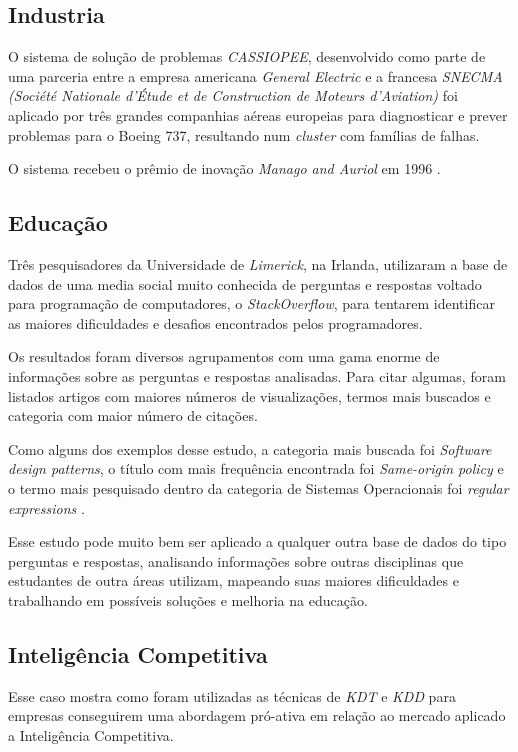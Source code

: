 \documentclass[conference]{IEEEtran}
\begin{document}
\subsection{Industria}
O sistema de solução de problemas \textit{CASSIOPEE}, desenvolvido como parte de uma parceria entre a empresa americana \textit{General Electric} e a francesa \textit{SNECMA (Société Nationale d'Étude et de Construction de Moteurs d'Aviation)} foi aplicado por três grandes companhias aéreas europeias para diagnosticar e prever problemas para o Boeing 737, resultando num \textit{cluster} com famílias de falhas.

O sistema recebeu o prêmio de inovação \textit{Manago and Auriol} em 1996 \cite{art9}.

\subsection{Educação}
Três pesquisadores da Universidade de \textit{Limerick}, na Irlanda, utilizaram a base de dados de uma media social muito conhecida de perguntas e respostas voltado para programação de computadores, o \textit{StackOverflow}, para tentarem identificar as maiores dificuldades e desafios encontrados pelos programadores. 

Os resultados foram diversos agrupamentos com uma gama enorme de informações sobre as perguntas e respostas analisadas. Para citar algumas, foram listados artigos com maiores números de visualizações, termos mais buscados e categoria com maior número de citações.

Como alguns dos exemplos desse estudo, a categoria mais buscada foi  \textit{Software design patterns}, o título com mais frequência encontrada foi \textit{Same-origin policy} e o termo mais pesquisado dentro da categoria de Sistemas Operacionais foi \textit{regular expressions} \cite{art3}.

Esse estudo pode muito bem ser aplicado a qualquer outra base de dados do tipo perguntas e respostas, analisando informações sobre outras disciplinas que estudantes de outra áreas utilizam, mapeando suas maiores dificuldades e trabalhando em possíveis soluções e melhoria na educação.

\subsection{Inteligência Competitiva}
Esse caso mostra como foram utilizadas as técnicas de \textit{KDT} e \textit{KDD} para empresas conseguirem uma abordagem pró-ativa em relação ao mercado aplicado a Inteligência Competitiva.
\end{document}
